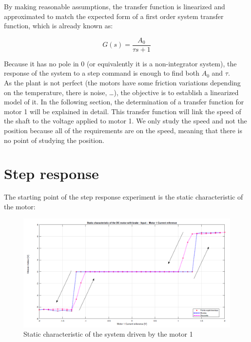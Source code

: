 By making reasonable assumptions, the transfer function is linearized and approximated to match the expected form of a first order system transfer function, which is already known as:

\begin{equation}
    G(s) = \frac{A_0}{\tau s + 1}
    \label{eq:1_st_order_TF}
\end{equation}

Because it has no pole in $0$ (or equivalently it is a non-integrator system), the response of the system to a step
command is enough to find both $A_0$ and $\tau$.\\

As the plant is not perfect (the motors have some friction variations depending on the temperature, there is noise, 
\dots), the objective is to establish a linearized model of it. In the following section, the determination of a
transfer function for motor 1 will be explained in detail. This transfer function will link the speed of the shaft to
the voltage applied to motor 1. We only study the speed and not the position because all of the requirements are on
the speed, meaning that there is no point of studying the position.

\section{Step response}

The starting point of the step response experiment is the static characteristic of the motor:

\begin{figure}[H]
    \centering
    \includegraphics[height=\textheight/4]{Pictures/static_characteristic_motor_1.png}
    \caption{Static characteristic of the system driven by the motor 1}
    \label{fig:static_characteristic_motor_1}
\end{figure}

